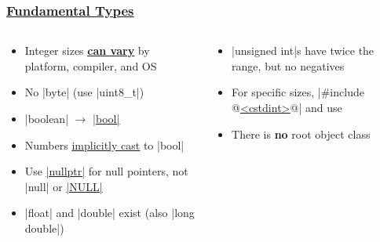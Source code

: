 \documentclass[glossy]{beamer}
\newcommand{\cppref}[2]{\href{http://en.cppreference.com/w/cpp/#1}{\underline{#2}}}
\begin{document}

\begin{frame}[fragile=singleslide]
  \frametitle{\cppref{language/types}{Fundamental Types}}
  \begin{columns}[t]
    \begin{column}{6cm}
      \begin{itemize}
        \item Integer sizes \cppref{language/types\#Data_models}{\textbf{can vary}} by platform, compiler, and OS
        \item No \javainline|byte| (use \cppinline|uint8_t|)
        \item \javainline|boolean| $\rightarrow$ \cppref{language/types\#Boolean_type}{\cppinline|bool|}
        \item Numbers \cppref{language/implicit_cast}{implicitly cast} to \cppinline|bool|
        \item Use \cppref{language/nullptr}{\cppinline|nullptr|} for null pointers, not \javainline|null| or \cppref{types/NULL}{\cppinline|NULL|}
        \item \cppinline|float| and \cppinline|double| exist (also \cppinline|long double|)
      \end{itemize}
    \end{column}

    \begin{column}{6cm}
      \begin{itemize}
        \item \cppinline|unsigned int|s have twice the range, but no negatives
        \item For specific sizes, \cppinline|#include @\cppref{preprocessor/include}{<cstdint>}@| and use 
        \item There is \textbf{no} root object class
      \end{itemize}
    \end{column}
  \end{columns}
\end{frame}

\end{document}
